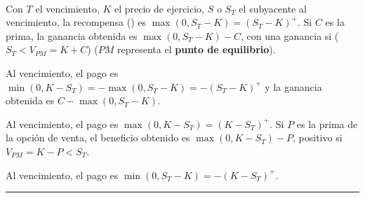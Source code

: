 \begin{f}

\ %


Con \(T\) el vencimiento, \(K\) el precio de ejercicio, \(S\) o \(S_T\) el subyacente al vencimiento, la recompensa () es \(\max (0, S_T-K)=( S_T-K)^{+}\).
Si \(C\) es la prima, la ganancia obtenida es \(\max (0, S_T-K)-C\), con una ganancia si (\(S_T<V_{PM}=K + C\)) (\(PM\) representa el \textbf{punto de equilibrio}).

		


\medskip



Al vencimiento, el pago es \(\min (0,K- S_T)=-\max(0, S_T-K)=-( S_T-K)^{+}\) y la ganancia obtenida es \(C-\max (0, S_T-K)\).

\medskip

		
\medskip



Al vencimiento, el pago es \(\max (0,K- S_T)=(K- S_T)^{+}\).
Si \(P\) es la prima de la opción de venta, el beneficio obtenido es \(\max (0,K- S_T)-P\), positivo si \(V_{PM}=K -P<S_T\).

\medskip

	    	     


\medskip

	    	     

Al vencimiento, el pago es \(\min (0, S_T-K)=-(K- S_T)^+\).


\end{f}
\hrule

